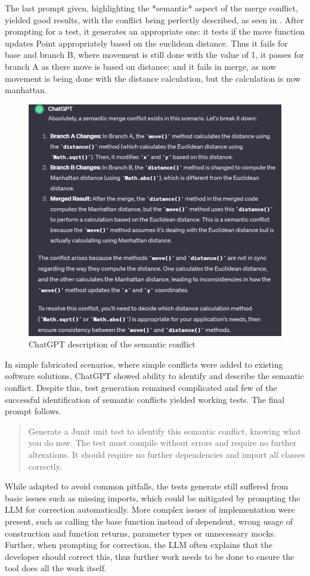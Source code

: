 The last prompt given, highlighting the *semantic* aspect of the merge conflict, yielded good results, with the conflict being perfectly described, as seen in . After prompting for a test, it generates an appropriate one: it tests if the move function updates Point appropriately based on the euclidean distance. Thus it fails for base and branch B, where movement is still done with the value of 1, it passes for branch A as there move is based on distance; and it fails in merge, as now movement is being done with the distance calculation, but the calculation is now manhattan.

\begin{figure}
    \centering
    \includegraphics[width=0.75\linewidth]{figures/image.png}
    \caption{ChatGPT description of the semantic conflict}
    \label{fig:semconf}
\end{figure}

In simple fabricated scenarios, where simple conflicts were added to existing software solutions, ChatGPT showed ability to identify and describe the semantic conflict. Despite this, test generation remained complicated and few of the successful identification of semantic conflicts yielded working tests. The final prompt follows.

\begin{quote}
Generate a Junit unit test to identify this semantic conflict, knowing what you do now. The test must compile without errors and require no further alterations. It should require no further dependencies and import all classes correctly.
\end{quote}

While adapted to avoid common pitfalls, the tests generate still suffered from basic issues such as missing imports, which could be mitigated by prompting the LLM for correction automatically. More complex issues of implementation were present, such as calling the base function instead of dependent, wrong usage of construction and function returns, parameter types or unnecessary mocks. Further, when prompting for correction, the LLM often explains that the developer should correct this, thus further work needs to be done to ensure the tool does all the work itself.

